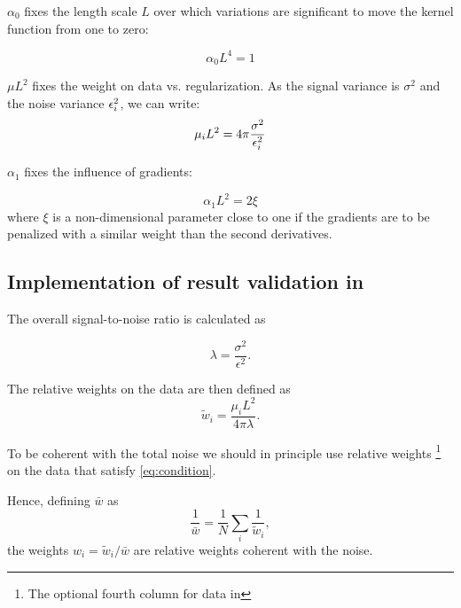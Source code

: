 $\alpha_0$ fixes the length scale $L$ over which variations are significant to move the kernel function from one to zero:

\begin{equation}
\alpha_0 L^4 = 1
\end{equation}

$\mu L^2$ fixes the weight on data vs. regularization. As the signal variance is $\sigma^2$ and the noise variance $\epsilon_i^2$, we can write:
\begin{equation}
\mu_i L^2= 4 \pi \frac{\sigma^2}{\epsilon_i^2}
\end{equation}

$\alpha_1$ fixes the influence of gradients:

\begin{equation}
\alpha_1 L^2 = 2 \xi
\end{equation}
where $\xi$ is a non-dimensional parameter close to one if the gradients are to be penalized with a similar weight than the second derivatives.


\subsection{Implementation of result validation in \diva\label{sec:qc}}

The overall signal-to-noise ratio is calculated as

\begin{equation}
\lambda = \frac{\sigma^2 }{\epsilon^2}.
\end{equation}

The relative weights on the data are then defined as
\begin{equation}
\tilde{w}_i= \frac{\mu_i L^2}{4 \pi \lambda}.
\end{equation}

To be coherent with the total noise we should in principle use relative weights 
\footnote{The optional fourth column for data in \diva}
on the data that satisfy \eqref{eq:condition}.

Hence, defining $\bar{w}$ as
\begin{equation}
\frac{1}{\bar{w}} = \frac{1}{N} \sum_i \frac{1}{\tilde{w}_i},
\end{equation}
the weights $w_i=\tilde{w}_i/\bar{w}$ are relative weights coherent with the noise.


